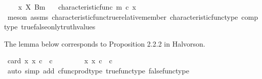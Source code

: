 \begin{isabellebody}
\ \ \ {\isachardoublequoteopen}{\isasymnot}\ {\isacharparenleft}{\kern0pt}x\ {\isasymin}\isactrlbsub X\isactrlesub \ {\isacharparenleft}{\kern0pt}B{\isacharcomma}{\kern0pt}m{\isacharparenright}{\kern0pt}{\isacharparenright}{\kern0pt}{\isachardoublequoteclose}\isanewline
\ \ \ {\isachardoublequoteopen}characteristic{\isacharunderscore}{\kern0pt}func\ m\ {\isasymcirc}\isactrlsub c\ x\ {\isacharequal}{\kern0pt}\ {\isasymf}{\isachardoublequoteclose}\isanewline
%
\isadelimproof
\ \ %
\endisadelimproof
%
\isatagproof
{}\isamarkupfalse%
\ {\isacharparenleft}{\kern0pt}meson\ assms\ characteristic{\isacharunderscore}{\kern0pt}func{\isacharunderscore}{\kern0pt}true{\isacharunderscore}{\kern0pt}relative{\isacharunderscore}{\kern0pt}member\ characteristic{\isacharunderscore}{\kern0pt}func{\isacharunderscore}{\kern0pt}type\ comp{\isacharunderscore}{\kern0pt}type\ true{\isacharunderscore}{\kern0pt}false{\isacharunderscore}{\kern0pt}only{\isacharunderscore}{\kern0pt}truth{\isacharunderscore}{\kern0pt}values{\isacharparenright}{\kern0pt}%
\endisatagproof
{\isafoldproof}%
%
\isadelimproof
%
\endisadelimproof
%
\begin{isamarkuptext}%
The lemma below corresponds to Proposition 2.2.2 in Halvorson.%
\end{isamarkuptext}\isamarkuptrue%
\isamarkupfalse%
\ {\isachardoublequoteopen}card\ {\isacharbraceleft}{\kern0pt}x{\isachardot}{\kern0pt}\ x\ {\isasymin}\isactrlsub c\ {\isasymOmega}\ {\isasymtimes}\isactrlsub c\ {\isasymOmega}{\isacharbraceright}{\kern0pt}\ {\isacharequal}{\kern0pt}\ {}{\isachardoublequoteclose}\isanewline
%
\isadelimproof
%
\endisadelimproof
%
\isatagproof
{}\isamarkupfalse%
\ {\isacharminus}{\kern0pt}\isanewline
\ \ \isamarkupfalse%
\ {\isachardoublequoteopen}{\isacharbraceleft}{\kern0pt}x{\isachardot}{\kern0pt}\ x\ {\isasymin}\isactrlsub c\ {\isasymOmega}\ {\isasymtimes}\isactrlsub c\ {\isasymOmega}{\isacharbraceright}{\kern0pt}\ {\isacharequal}{\kern0pt}\ {\isacharbraceleft}{\kern0pt}{\isasymlangle}{\isasymt}{\isacharcomma}{\kern0pt}{\isasymt}{\isasymrangle}{\isacharcomma}{\kern0pt}\ {\isasymlangle}{\isasymt}{\isacharcomma}{\kern0pt}{\isasymf}{\isasymrangle}{\isacharcomma}{\kern0pt}\ {\isasymlangle}{\isasymf}{\isacharcomma}{\kern0pt}{\isasymt}{\isasymrangle}{\isacharcomma}{\kern0pt}\ {\isasymlangle}{\isasymf}{\isacharcomma}{\kern0pt}{\isasymf}{\isasymrangle}{\isacharbraceright}{\kern0pt}{\isachardoublequoteclose}\isanewline
\ \ \ \ \isamarkupfalse%
\ {\isacharparenleft}{\kern0pt}auto\ simp\ add{\isacharcolon}{\kern0pt}\ cfunc{\isacharunderscore}{\kern0pt}prod{\isacharunderscore}{\kern0pt}type\ true{\isacharunderscore}{\kern0pt}func{\isacharunderscore}{\kern0pt}type\ false{\isacharunderscore}{\kern0pt}func{\isacharunderscore}{\kern0pt}type{\isacharcomma}{\kern0pt}\isanewline

\end{isabellebody}
